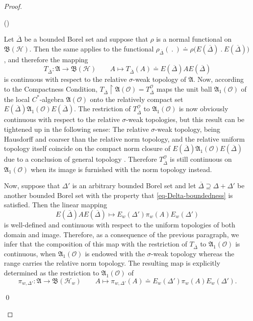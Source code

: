\documentclass[11pt,twoside,openright]{report}
\theoremstyle{definition}
\theoremstyle{plain}
\theoremstyle{remark}
\theoremstyle{assumption}
\newcommand{\Afrak}{\mathfrak{A}}
\newcommand{\Oscr}{\mathscr{O}}
\newcommand{\Deltabar}{\overline{\Delta}}
\newcommand{\BH}{\mathfrak{B} ( \mathscr{H} )}
\newcommand{\BHw}{\mathfrak{B} ( \mathscr{H}_w )}
\newcommand{\EDbar}{E ( \overline{\Delta} )}
\newcommand{\EwDprime}{E_w ( \Delta' )}
\newcommand{\AO}{\mathfrak{A} ( \mathscr{O} )}
\newcommand{\AoneO}{\mathfrak{A}_1 ( \mathscr{O} )}
\newcommand{\piwDprime}{\pi_{w , \Delta'}}
\newcommand{\TODbar}{T_{\overline{\Delta}}^\Oscr}
\newcounter{proofitem}
\newenvironment{prooflist}{\begin{list}{(\roman{proofitem})}%
  {\usecounter{proofitem} \setlength{\topsep}{0ex}%
   \setlength{\parsep}{0.2ex} \setlength{\itemsep}{0.4ex}%
   \setlength{\leftmargin}{0em} \setlength{\itemindent}{0.5em}%
   \setlength{\listparindent}{1em}}}{\qed \end{list}}
\begin{document}
\begin{proof}
  \begin{prooflist}
  \item Let $\Deltabar$ be a bounded Borel set and suppose that $\rho$
    is a normal functional on $\BH$. Then the same applies to the
    functional $\rho_{\Deltabar} (~.~) \doteq \rho \bigl(
    \EDbar~.~\EDbar \bigr)$, and therefore the mapping
    \begin{equation*}
      T_{\Deltabar} : \Afrak \rightarrow \BH \qquad A \mapsto
      T_{\Deltabar} ( A ) \doteq \EDbar A \EDbar
    \end{equation*}
    is continuous with respect to the relative $\sigma$-weak topology
    of $\Afrak$. Now, according to the Compactness Condition,
    $T_{\Deltabar} \restriction \AO = \TODbar$ maps the unit ball
    $\AoneO$ of the local $C^*$-algebra $\AO$ onto the relatively
    compact set $\EDbar \AoneO \EDbar$. The restriction of $\TODbar$
    to $\AoneO$ is now obviously continuous with respect to the
    relative $\sigma$-weak topologies, but this result can be
    tightened up in the following sense: The relative $\sigma$-weak
    topology, being Hausdorff and coarser than the relative norm
    topology, and the relative uniform topology itself coincide on the
    compact norm closure of $\EDbar \AoneO \EDbar$ due to a conclusion
    of general topology \cite[Chapter One,
    \S\,3,\,2.(6)]{koethe:1983}. Therefore $\TODbar$ is still
    continuous on $\AoneO$ when its image is furnished with the norm
    topology instead.

    Now, suppose that $\Delta'$ is an arbitrary bounded Borel set and
    let $\Deltabar \supseteq \Delta + \Delta'$ be another bounded
    Borel set with the property that \eqref{eq-Delta-boundedness} is
    satisfied. Then the linear mapping
    \begin{equation}
      \label{eq-sandwich-mapping}
      \EDbar A \EDbar \mapsto \EwDprime \pi_w ( A ) \EwDprime
    \end{equation}
    is well-defined and continuous with respect to the uniform
    topologies of both domain and image. Therefore, as a consequence
    of the previous paragraph, we infer that the composition of this
    map with the restriction of $T_{\Deltabar}$ to $\AoneO$ is
    continuous, when $\AoneO$ is endowed with the $\sigma$-weak
    topology whereas the range carries the relative norm topology. The
    resulting map is explicitly determined as the restriction to
    $\AoneO$ of
    \begin{equation}
      \label{eq-sandwich-representation}
      \piwDprime : \Afrak \rightarrow \BHw \qquad A \mapsto \piwDprime
      ( A ) \doteq \EwDprime \pi_w ( A ) \EwDprime \text{.}
    \end{equation}
     

\end{prooflist}
\end{proof}
\end{document}
